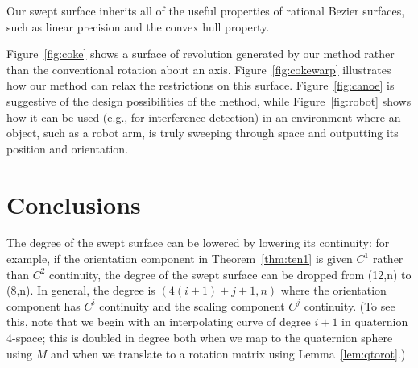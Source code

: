 Our swept surface inherits all of the useful properties of rational Bezier
surfaces, such as linear precision and the convex hull property.

\begin{example}
Figure~\ref{fig:coke} shows a surface of revolution generated
by our method rather than the conventional rotation about an axis.
Figure~\ref{fig:cokewarp} illustrates how our method can relax the
restrictions on this surface.
Figure~\ref{fig:canoe} is suggestive of the design
possibilities of the method,
while Figure~\ref{fig:robot} shows how it can be used (e.g., for 
interference detection) in an environment
where an object, such as a robot arm, is truly sweeping through space
and outputting its position and orientation.
\end{example}




\section{Conclusions}

The degree of the swept surface can be lowered by lowering its
continuity: for example, if the orientation component
in Theorem~\ref{thm:ten1} is given $C^1$ rather than $C^2$ continuity, 
the degree of the swept surface can be dropped from (12,n) to (8,n).
In general, the degree is $(4(i+1)+j+1,n)$ where the orientation
component has $C^i$ continuity and the scaling component $C^j$ continuity.
(To see this, note that we begin with an interpolating curve of degree $i+1$
in quaternion 4-space; this is doubled in degree both when we map to the 
quaternion sphere using $M$ and when we translate to a rotation matrix
using Lemma~\ref{lem:qtorot}.)

